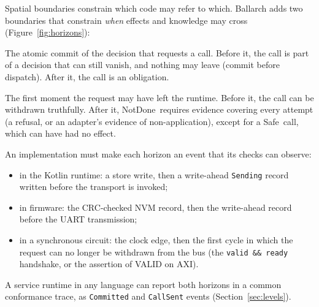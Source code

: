 \documentclass[11pt]{article}
\theoremstyle{definition}
\theoremstyle{plain}
\newcommand{\NotDone}{\textsf{NotDone}}
\newcommand{\Safe}{\textsf{Safe}}
\begin{document}
Spatial boundaries constrain which code may refer to which. Ballarch adds two boundaries that constrain \emph{when} effects and knowledge may cross (Figure~\ref{fig:horizons}):
\begin{description}[leftmargin=1em]
  \item[Commit horizon.] The atomic commit of the decision that requests a call. Before it, the call is part of a decision that can still vanish, and nothing may leave (commit before dispatch). After it, the call is an obligation.
  \item[Send horizon.] The first moment the request may have left the runtime. Before it, the call can be withdrawn truthfully. After it, \NotDone\ requires evidence covering every attempt (a refusal, or an adapter's evidence of non-application), except for a \Safe\ call, which can have had no effect.
\end{description}
An implementation must make each horizon an event that its checks can observe:
\begin{itemize}[nosep]
  \item in the Kotlin runtime: a store write, then a write-ahead \texttt{Sending} record written before the transport is invoked;
  \item in firmware: the CRC-checked NVM record, then the write-ahead record before the UART transmission;
  \item in a synchronous circuit: the clock edge, then the first cycle in which the request can no longer be withdrawn from the bus (the \texttt{valid \&\& ready} handshake, or the assertion of VALID on AXI).
\end{itemize}
A service runtime in any language can report both horizons in a common conformance trace, as \texttt{Committed} and \texttt{CallSent} events (Section~\ref{sec:levels}).
\end{document}
